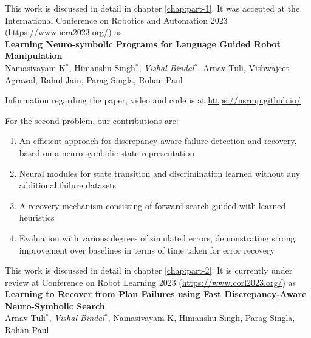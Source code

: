 This work is discussed in detail in chapter \ref{chap:part-1}. It was accepted at the International Conference on Robotics and Automation 2023 (\url{https://www.icra2023.org/}) as \\
\textbf{Learning Neuro-symbolic Programs for Language Guided
Robot Manipulation} \\
Namasivayam K$^{*}$, Himanshu Singh$^{*}$, \emph{Vishal Bindal$^{*}$}, Arnav Tuli, Vishwajeet Agrawal, Rahul Jain, Parag Singla, Rohan Paul

Information regarding the paper, video and code is at \url{https://nsrmp.github.io/} 


 For the second problem, our contributions are:
 \begin{enumerate}
     \item An efficient approach for discrepancy-aware failure detection and recovery, based on a neuro-symbolic state representation
     \item Neural modules for state transition and discrimination learned without any additional failure datasets
     \item A recovery mechanism consisting of forward search guided with learned heuristics
     \item Evaluation with various degrees of simulated errors, demonstrating strong improvement over baselines in terms of time taken for error recovery
 \end{enumerate}

 This work is discussed in detail in chapter \ref{chap:part-2}. It is currently under review at Conference on Robot Learning 2023 (\url{https://www.corl2023.org/}) as \\
 \textbf{Learning to Recover from Plan Failures using Fast Discrepancy-Aware Neuro-Symbolic Search} \\
 Arnav Tuli$^{*}$, \emph{Vishal Bindal$^{*}$}, Namasivayam K, Himanshu Singh, Parag Singla, Rohan Paul
